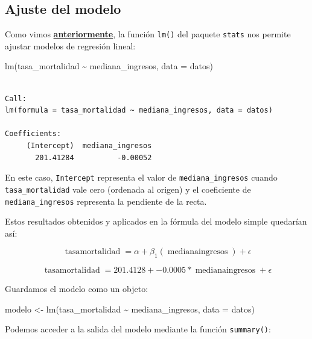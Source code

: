 \documentclass[
  spanish,
  a4paper,
]{scrbook}
\newenvironment{Shaded}{\begin{snugshade}}{\end{snugshade}}
\newcommand{\AttributeTok}[1]{\textcolor[rgb]{0.40,0.45,0.13}{#1}}
\newcommand{\FunctionTok}[1]{\textcolor[rgb]{0.28,0.35,0.67}{#1}}
\newcommand{\NormalTok}[1]{\textcolor[rgb]{0.00,0.23,0.31}{#1}}
\newcommand{\OtherTok}[1]{\textcolor[rgb]{0.00,0.23,0.31}{#1}}
\newcommand{\SpecialCharTok}[1]{\textcolor[rgb]{0.37,0.37,0.37}{#1}}
\begin{document}
\subsection{Ajuste del modelo}\label{ajuste-del-modelo}

Como vimos
\hyperref[introducciuxf3n-al-modelado-estaduxedstico]{\textbf{anteriormente}},
la función \texttt{lm()} del paquete \texttt{stats} nos permite ajustar
modelos de regresión lineal:

\begin{Shaded}
\begin{Highlighting}[]
\FunctionTok{lm}\NormalTok{(tasa\_mortalidad }\SpecialCharTok{\textasciitilde{}}\NormalTok{ mediana\_ingresos, }\AttributeTok{data =}\NormalTok{ datos)}
\end{Highlighting}
\end{Shaded}

\begin{verbatim}

Call:
lm(formula = tasa_mortalidad ~ mediana_ingresos, data = datos)

Coefficients:
     (Intercept)  mediana_ingresos  
       201.41284          -0.00052  
\end{verbatim}

En este caso, \texttt{Intercept} representa el valor de
\texttt{mediana\_ingresos} cuando \texttt{tasa\_mortalidad} vale cero
(ordenada al origen) y el coeficiente de \texttt{mediana\_ingresos}
representa la pendiente de la recta.

Estos resultados obtenidos y aplicados en la fórmula del modelo simple
quedarían así:

\[
\operatorname{tasa mortalidad} = \alpha + \beta_{1}(\operatorname{mediana ingresos}) + \epsilon
\]

\[
\operatorname{tasa mortalidad} = 201.4128 + -0.0005*\operatorname{mediana ingresos} + \epsilon
\]

Guardamos el modelo como un objeto:

\begin{Shaded}
\begin{Highlighting}[]
\NormalTok{modelo }\OtherTok{\textless{}{-}} \FunctionTok{lm}\NormalTok{(tasa\_mortalidad }\SpecialCharTok{\textasciitilde{}}\NormalTok{ mediana\_ingresos, }\AttributeTok{data =}\NormalTok{ datos)}
\end{Highlighting}
\end{Shaded}

Podemos acceder a la salida del modelo mediante la función
\texttt{summary()}:
\end{document}
